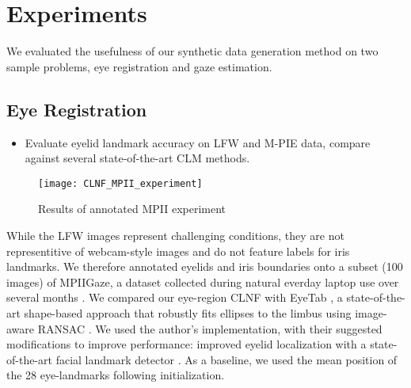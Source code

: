
\section{Experiments}

We evaluated the usefulness of our synthetic data generation method on two sample problems, eye registration and gaze estimation.


\subsection{Eye Registration}


\begin{itemize}
    \item Evaluate eyelid landmark accuracy on LFW and M-PIE data, compare against several state-of-the-art CLM methods.
\end{itemize}

\begin{figure}
    
    \texttt{[image: CLNF\_MPII\_experiment]}
    \caption{Results of annotated MPII experiment}
    \label{fig:eye_model}
\end{figure}

While the LFW images represent challenging conditions, they are not representitive of webcam-style images and do not feature labels for iris landmarks. We therefore annotated eyelids and iris boundaries onto a subset (100 images) of MPIIGaze, a dataset collected during natural everday laptop use over several months \cite{zhang15_cvpr}. We compared our eye-region CLNF with EyeTab \cite{wood2014eyetab}, a state-of-the-art shape-based approach that robustly fits ellipses to the limbus using image-aware RANSAC \cite{swirski2012robust}. We used the author's implementation, with their suggested modifications to improve performance: improved eyelid localization with a state-of-the-art facial landmark detector \cite{baltrusaitis2013constrained}. As a baseline, we used the mean position of the 28 eye-landmarks following initialization.

